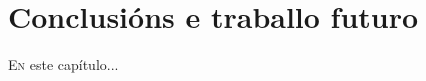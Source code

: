 \chapter{Conclusións e traballo futuro}
\minitoc
\label{chap:Conclusionsetraballofuturo}
\vspace{0.5cm}


  \lettrine{E}{n} este capítulo...

